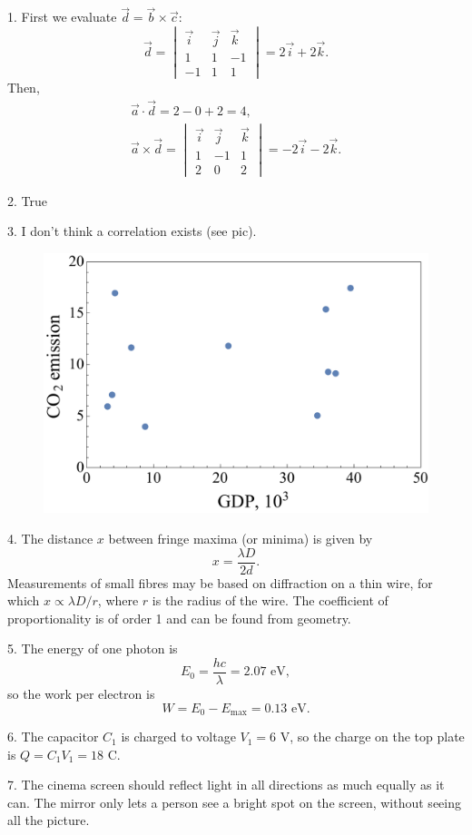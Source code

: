 \documentclass[14pt]{article}
\begin{document}
1. First we evaluate $\vec{d}=\vec{b}\times\vec{c}$:
$$
  \vec{d}=\begin{vmatrix}
  \vec{i} & \vec{j} & \vec{k}\\
  1 & 1 & -1\\
  -1 & 1 & 1
  \end{vmatrix}=2\vec{i}+2\vec{k}.
$$
Then,
\begin{gather}
  \vec{a}\cdot\vec{d}=2-0+2=4,\nonumber\\
  \vec{a}\times\vec{d}=\begin{vmatrix}
  \vec{i} & \vec{j} & \vec{k}\\
  1 & -1 & 1\\
  2 & 0 & 2
  \end{vmatrix}=-2\vec{i}-2\vec{k}.\nonumber
\end{gather}

2. True

3. I don't think a correlation exists (see pic).

\begin{figure}[h]
\begin{center}
\includegraphics[scale=0.6]{task1pic1.pdf}
\end{center}
\end{figure}

4. The distance $x$ between fringe maxima (or minima) is given by
$$
  x=\frac{\lambda D}{2d}.
$$
Measurements of small fibres may be based on diffraction on a thin wire, for which $x\propto \lambda D/r$, where $r$ is the radius of the wire. The coefficient of proportionality is of order 1 and can be found from geometry.

5. The energy of one photon is
$$
  E_0=\frac{hc}{\lambda}=2.07\text{ eV},
$$
so the work per electron is
$$
  W=E_0-E_\text{max}=0.13\text{ eV}.
$$

6. The capacitor $C_1$ is charged to voltage $V_1=6$ V, so the charge on the top plate is $Q=C_1 V_1=18$ \micro C.

7. The cinema screen should reflect light in all directions as much equally as it can. The mirror only lets a person see a bright spot on the screen, without seeing all the picture.
\end{document}
